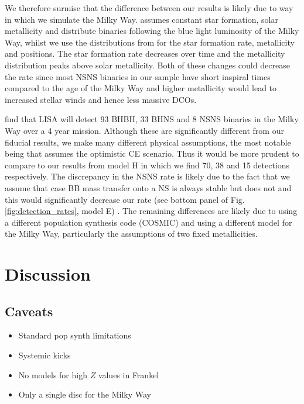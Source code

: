 \documentclass[twocolumn]{aastex63}
\newcommand{\modCaseBB}{E}
\newcommand{\modOpt}{H}
\begin{document}
We therefore surmise that the difference between our results is likely due to way in which we simulate the Milky Way. \citet{Lau+2020} assumes constant star formation, solar metallicity and distribute binaries following the blue light luminosity of the Milky Way, whilst we use the distributions from \citet{Frankel+2018} for the star formation rate, metallicity and positions. The \citet{Frankel+2018} star formation rate decreases over time and the metallicity distribution peaks above solar metallicity. Both of these changes could decrease the rate since most NSNS binaries in our sample have short inspiral times compared to the age of the Milky Way and higher metallicity would lead to increased stellar winds and hence less massive DCOs.

\citet{Breivik+2020} find that LISA will detect 93 BHBH, 33 BHNS and 8 NSNS binaries in the Milky Way over a 4 year mission. Although these are significantly different from our fiducial results, we make many different physical assumptions, the most notable being that \citet{Breivik+2020} assumes the optimistic CE scenario. Thus it would be more prudent to compare to our results from model \modOpt{} in which we find 70, 38 and 15 detections respectively. The discrepancy in the NSNS rate is likely due to the fact that we assume that case BB mass transfer onto a NS is always stable but \citet{Breivik+2020} does not and this would significantly decrease our rate (see bottom panel of Fig.\,\ref{fig:detection_rates}, model \modCaseBB{}) . The remaining differences are likely due to using a different population synthesis code (COSMIC) and using a different model for the Milky Way, particularly the assumptions of two fixed metallicities.

\section{Discussion} \label{sec:discussion}
\subsection{Caveats}
\begin{itemize}
    \item Standard pop synth limitations
    \item Systemic kicks
    \item No models for high $Z$ values in Frankel
    \item Only a single disc for the Milky Way
\end{itemize}
\end{document}
